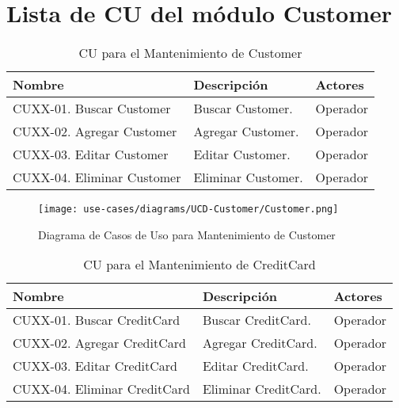 
	\section{Lista de CU del m\'odulo Customer} \label{sec:uc-customer}

	\begin{table}[H]
		\caption{CU para el Mantenimiento de Customer}
		\label{uc-entity-customer}
		\begin{center}
		\begin{tabularx}{0.90\linewidth}{ X X X }
			\hline
			\textbf{Nombre} & \textbf{Descripci\'on} & \textbf{Actores} \\
			\hline
			CUXX-01. Buscar Customer & Buscar Customer. & Operador \\
			CUXX-02. Agregar Customer & Agregar Customer. & Operador \\
			CUXX-03. Editar Customer & Editar Customer. & Operador \\
			CUXX-04. Eliminar Customer & Eliminar Customer. & Operador \\
			\hline
		\end{tabularx}
		\end{center}
	\end{table}
	
	\begin{figure}[H]
		\begin{center}
		\label{tab:ucd-entity-customer}
		\texttt{[image: use-cases/diagrams/UCD-Customer/Customer.png]}
		\caption{Diagrama de Casos de Uso para Mantenimiento de Customer}
		\end{center}
	\end{figure}
	\begin{table}[H]
		\caption{CU para el Mantenimiento de CreditCard}
		\label{uc-entity-creditcard}
		\begin{center}
		\begin{tabularx}{0.90\linewidth}{ X X X }
			\hline
			\textbf{Nombre} & \textbf{Descripci\'on} & \textbf{Actores} \\
			\hline
			CUXX-01. Buscar CreditCard & Buscar CreditCard. & Operador \\
			CUXX-02. Agregar CreditCard & Agregar CreditCard. & Operador \\
			CUXX-03. Editar CreditCard & Editar CreditCard. & Operador \\
			CUXX-04. Eliminar CreditCard & Eliminar CreditCard. & Operador \\
			\hline
		\end{tabularx}
		\end{center}
	\end{table}
	
